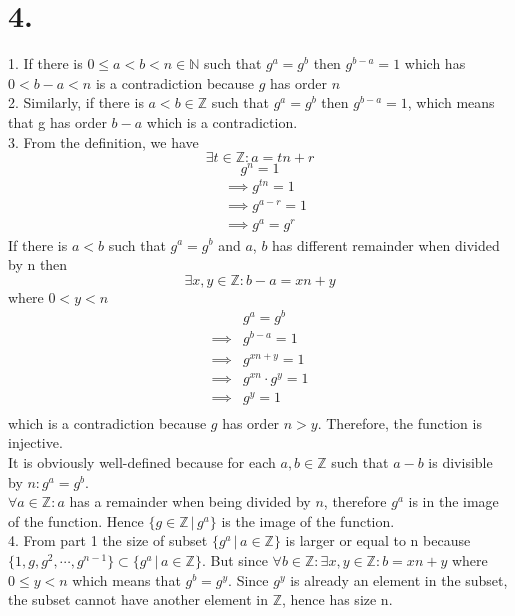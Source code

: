 \documentclass[11pt]{article}
\begin{document}
\pagebreak
\section*{4.}
1. If there is $0 \le a < b <n \in \mathbb{N}$ such that $g^a = g^b$ then $g^{b-a} = 1$ which has $0 <b-a<n$ is a contradiction because $g$ has order $n$ \\
2. Similarly, if there is $a<b \in \mathbb{Z}$ such that $g^a = g^b$ then $g^{b-a} = 1$, which means that g has order $b-a$ which is a contradiction. \\
3. From the definition, we have
\[
\exists t \in \mathbb{Z}: a = tn + r
\]
\[
g^n = 1
\]
\begin{equation*}
\begin{aligned}
&\implies g^{tn} = 1 \\
&\implies g^{a-r} = 1 \\
&\implies g^a = g^r
\end{aligned}
\end{equation*}
If there is $a<b$ such that $g^a = g^b$ and $a$, $b$ has different remainder when divided by n then
\[\exists x,y \in \mathbb{Z}: b-a = xn + y\] where $0<y<n$
\begin{equation*}
\begin{aligned}
&g^a = g^b \\
\implies &g^{b-a} = 1 \\
\implies &g^{xn+y} = 1 \\
\implies &g^{xn} \cdot g^y = 1 \\
\implies &g^y = 1 \\
\end{aligned}
\end{equation*}
which is a contradiction because $g$ has order $n > y$. Therefore, the function is injective. \\
It is obviously well-defined because for each $a,b \in \mathbb{Z}$ such that $a-b$ is divisible by $n: g^a = g^b$. \\
$\forall a \in \mathbb{Z}: a$ has a remainder when being divided by $n$, therefore $g^a$ is in the image of the function. Hence $\{g \in \mathbb{Z} \, | \, g^a\}$ is the image of the function. \\
4.
From part 1 the size of subset $\{g^a \, | \, a \in \mathbb{Z}\}$ is larger or equal to n because $\{1,g,g^2, \cdots, g^{n-1}\}\subset \{g^a \, | \, a \in \mathbb{Z}\}$. But since $\forall b \in \mathbb{Z}: \exists x,y \in \mathbb{Z} : b = xn + y$ where $0 \le y < n$ which means that $g^b = g^y$. Since $g^y$ is already an element in the subset, the subset cannot have another element in $\mathbb{Z}$, hence has size n.
\end{document}
